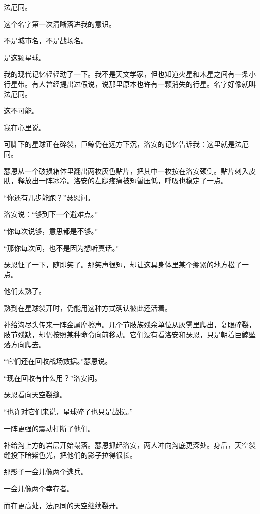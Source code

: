 法厄同。

这个名字第一次清晰落进我的意识。

不是城市名，不是战场名。

是这颗星球。

我的现代记忆轻轻动了一下。我不是天文学家，但也知道火星和木星之间有一条小行星带。有人曾经提出过假说，说那里原本也许有一颗消失的行星。名字好像就叫法厄同。

这不可能。

我在心里说。

可脚下的星球正在碎裂，巨鲸仍在远方下沉，洛安的记忆告诉我：这里就是法厄同。

瑟恩从一个破损箱体里翻出两枚灰色贴片，把其中一枚按在洛安颈侧。贴片刺入皮肤，释放出一阵冰冷。洛安的左腿疼痛被短暂压低，呼吸也稳定了一点。

“你还有几步能跑？”瑟恩问。

洛安说：“够到下一个避难点。”

“你每次说够，意思都是不够。”

“那你每次问，也不是因为想听真话。”

瑟恩怔了一下，随即笑了。那笑声很短，却让这具身体里某个绷紧的地方松了一点。

他们太熟了。

熟到在星球裂开时，仍能用这种方式确认彼此还活着。

补给沟尽头传来一阵金属摩擦声。几个节肢族残余单位从灰雾里爬出，复眼碎裂，肢节残缺，却仍按照某种命令向前移动。它们没有看洛安和瑟恩，只是朝着巨鲸坠落方向爬去。

“它们还在回收战场数据。”瑟恩说。

“现在回收有什么用？”洛安问。

瑟恩看向天空裂缝。

“也许对它们来说，星球碎了也只是战损。”

一阵更强的震动打断了他们。

补给沟上方的岩层开始塌落。瑟恩抓起洛安，两人冲向沟底更深处。身后，天空裂缝投下暗紫色光，把他们的影子拉得很长。

那影子一会儿像两个逃兵。

一会儿像两个幸存者。

而在更高处，法厄同的天空继续裂开。
